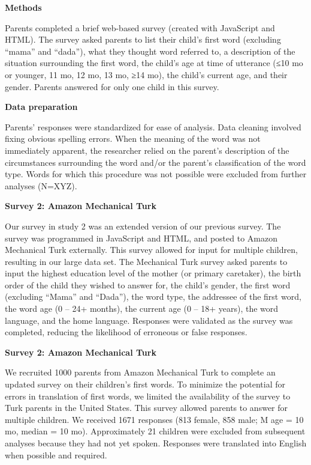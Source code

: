 \documentclass[10pt, a4paper]{article}
\begin{document}
\begin{multicols}{2}
\begin{center} 
\textbf{Methods}
\end{center}
Parents completed a brief web-based survey (created with JavaScript and HTML). The survey asked parents to list their child’s first word (excluding “mama” and “dada”), what they thought word referred to, a description of the situation surrounding the first word, the child’s age at time of utterance (≤10 mo or younger, 11 mo, 12 mo, 13 mo, ≥14 mo), the child’s current age, and their gender. Parents answered for only one child in this survey.

\begin{center} 
\textbf{Data preparation}
\end{center}
Parents’ responses were standardized for ease of analysis. Data cleaning involved fixing obvious spelling errors. When the meaning of the word was not immediately apparent, the researcher relied on the parent’s description of the circumstances surrounding the word and/or the parent’s classification of the word type. Words for which this procedure was not possible were excluded from further analyses (N=XYZ).

\begin{center} 
\textbf{Survey 2: Amazon Mechanical Turk}
\end{center}
Our survey in study 2 was an extended version of our previous survey. The survey was programmed in JavaScript and HTML, and posted to Amazon Mechanical Turk externally. This survey allowed for input for multiple children, resulting in our large data set. The Mechanical Turk survey asked parents to input the highest education level of the mother (or primary caretaker), the birth order of the child they wished to answer for, the child’s gender, the first word (excluding “Mama” and “Dada”), the word type, the addressee of the first word, the word age (0 – 24+ months), the current age (0 – 18+ years), the word language, and the home language.  Responses were validated as the survey was completed, reducing the likelihood of erroneous or false responses. 

\begin{center} 
\textbf{Survey 2: Amazon Mechanical Turk}
\end{center}
We recruited 1000 parents from Amazon Mechanical Turk to complete an updated survey on their children’s first words. To minimize the potential for errors in translation of first words, we limited the availability of the survey to Turk parents in the United States. This survey allowed parents to answer for multiple children. We received 1671 responses (813 female, 858 male; M age = 10 mo, median = 10 mo). Approximately 21 children were excluded from subsequent analyses because they had not yet spoken. Responses were translated into English when possible and required.


\end{multicols}
\end{document}
